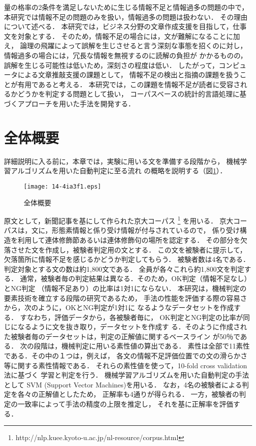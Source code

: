 \documentclass[japanese]{jnlp_1.3e}
\begin{document}
量の格率の2条件を満足しないために生じる情報不足と情報過多の問題の中で，
本研究では情報不足の問題のみを扱い，情報過多の問題は扱わない．
その理由について述べる．
本研究では，ビジネス分野の文章作成支援を目指して，仕事文を対象とする．
そのため，情報不足の場合には，文が難解になることに加え，
論理の飛躍によって誤解を生じさせると言う深刻な事態を招くのに対し，
情報過多の場合には，冗長な情報を無視するのに読解の負担が
かかるものの，誤解を生じる可能性は低いため，深刻さの程度は低い．
したがって，コンピュータによる文章推敲支援の課題として，
情報不足の検出と指摘の課題を扱うことが有用であると考える．
本研究では，この課題を情報不足が読者に受容されるかどうかを判定する問題として扱い，
コーパスベースの統計的言語処理に基づくアプローチを用いた手法を開発する．



\section{全体概要}

詳細説明に入る前に，本章では，実験に用いる文を準備する段階から，
機械学習アルゴリズムを用いた自動判定に至る流れ
の概略を説明する（図\ref{fig:全体概要}）．

\begin{figure}[b]
    \texttt{[image: 14-4ia3f1.eps]}
  \caption{全体概要}
  \label{fig:全体概要}
\end{figure}

原文として，新聞記事を基にして作られた京大コーパス
\footnote{http://nlp.kuee.kyoto-u.ac.jp/nl-resource/corpus.html} 
を用いる．
京大コーパスは，文に，形態素情報と係り受け情報が付与されているので，
係り受け構造を利用して連体修飾節あるいは連体修飾句の場所を認定する．
その部分を欠落させた文を作成し，被験者判定用の文とする．
この文を被験者に提示して，欠落箇所に情報不足を感じるかどうか判定してもらう．
被験者数は4名である．判定対象とする文の数は約1,800文である．
全員が各々これら約1,800文を判定する．
通常，被験者毎の判定結果は異なる．そのため，OK判定（情報不足なし）とNG判定
（情報不足あり）の比率は1対1にならない．
本研究は，機械判定の要素技術を確立する段階の研究であるため，
手法の性能を評価する際の容易さから，次のように，OKとNG判定が1対1に
なるようなデータセットを作成する．
すなわち，評価データから，各被験者毎に，
OK判定とNG判定の比率が同じになるように文を抜き取り，データセットを作成す
る．そのように作成された被験者毎のデータセットは，判定の正解値に関するベースライン
が50{\kern0pt}％である．
次の段階は，機械判定に用いる素性値の算出である．
素性は全部で11素性である．その中の１つは，例えば，
各文の情報不足評価位置での文の滑らかさ等に関する素性情報である．
それらの素性値を使って，10-fold cross validation法に基づく
学習と判定を行う．
機械学習アルゴリズムを用いた自動判定の手法として
SVM (Support Vector Machines)を用いる．
なお，4名の被験者による判定を各々の正解値としたため，
正解率も4通りが得られる．
一方，被験者の判定の一致率によって手法の精度の上限を推定し，
それを基に正解率を評価する．
\end{document}
